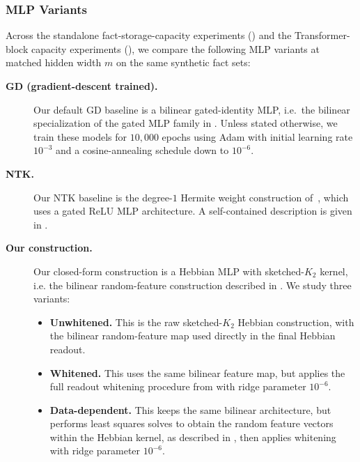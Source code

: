 \subsubsection{MLP Variants}
\label{app:exp:mlp-variant-definitions}

Across the standalone fact-storage-capacity experiments () and the Transformer-block capacity experiments (), we compare the following MLP variants at matched hidden width $m$ on the same synthetic fact sets:

\begin{description}
    \item[\textbf{GD (gradient-descent trained).}] Our default GD baseline is a bilinear gated-identity MLP, i.e.\ the bilinear specialization of the gated MLP family in .
    Unless stated otherwise, we train these models for
    $10{,}000$ epochs using Adam with initial learning rate $10^{-3}$ and a
    cosine-annealing schedule down to $10^{-6}$.

    \item[\textbf{NTK.}] Our NTK baseline is the degree-$1$ Hermite weight construction of~\citet{nichani2024understandingfactualrecalltransformers}, which uses a gated ReLU MLP architecture.
    A self-contained description is given in .

    \item[\textbf{Our construction.}] Our closed-form construction is a Hebbian MLP with
    sketched-$K_{2}$ kernel, i.e. the bilinear random-feature construction described in
    .
    We study three variants:
    \begin{itemize}
        \item \textbf{Unwhitened.} This is the raw sketched-$K_{2}$ Hebbian construction,
        with the bilinear random-feature map used directly in the final Hebbian readout.
        \item \textbf{Whitened.} This uses the same bilinear feature map, but applies the
        full readout whitening procedure from
         with ridge parameter $10^{-6}$.
        \item \textbf{Data-dependent.} This keeps the same bilinear architecture, but performs least squares solves to obtain the random feature vectors within the Hebbian kernel, as described in
        , then applies whitening with ridge parameter $10^{-6}$.
    \end{itemize}
\end{description}

